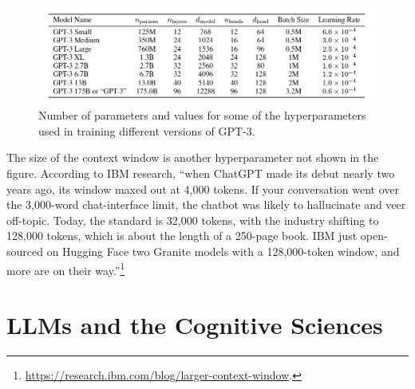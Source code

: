\begin{figure}[ht]
\centering
\includegraphics[scale=.4]{./images/gpt3_params.png}
\caption[\url{https://arxiv.org/abs/2005.14165}.]{Number of parameters and
values for some of the hyperparameters used in training different versions of
GPT-3.
}
\label{gptParams}
\end{figure}

The size of the context window is another hyperparameter not shown in the
figure. According to IBM research, ``when ChatGPT made its debut nearly two
years ago, its window maxed out at 4,000 tokens. If your conversation went over
the 3,000-word chat-interface limit, the chatbot was likely to hallucinate and
veer off-topic. Today, the standard is 32,000 tokens, with the industry
shifting to 128,000 tokens, which is about the length of a 250-page book. IBM
just open-sourced on Hugging Face two Granite models with a 128,000-token
window, and more are on their
way.''\footnote{\url{https://research.ibm.com/blog/larger-context-window}.}

\section{LLMs and the Cognitive Sciences}\label{llm_cogsci}

